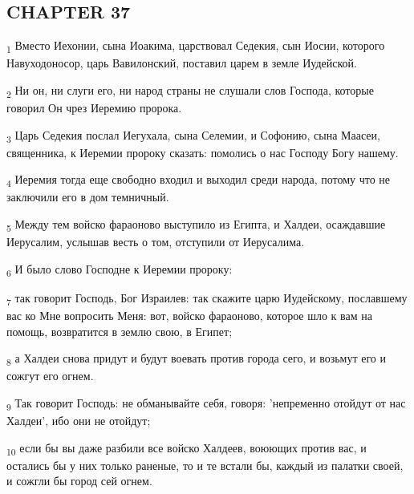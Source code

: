 \subsection{CHAPTER 37}
\begin{tcolorbox}
\textsubscript{1} Вместо Иехонии, сына Иоакима, царствовал Седекия, сын Иосии, которого Навуходоносор, царь Вавилонский, поставил царем в земле Иудейской.
\end{tcolorbox}
\begin{tcolorbox}
\textsubscript{2} Ни он, ни слуги его, ни народ страны не слушали слов Господа, которые говорил Он чрез Иеремию пророка.
\end{tcolorbox}
\begin{tcolorbox}
\textsubscript{3} Царь Седекия послал Иегухала, сына Селемии, и Софонию, сына Маасеи, священника, к Иеремии пророку сказать: помолись о нас Господу Богу нашему.
\end{tcolorbox}
\begin{tcolorbox}
\textsubscript{4} Иеремия тогда еще свободно входил и выходил среди народа, потому что не заключили его в дом темничный.
\end{tcolorbox}
\begin{tcolorbox}
\textsubscript{5} Между тем войско фараоново выступило из Египта, и Халдеи, осаждавшие Иерусалим, услышав весть о том, отступили от Иерусалима.
\end{tcolorbox}
\begin{tcolorbox}
\textsubscript{6} И было слово Господне к Иеремии пророку:
\end{tcolorbox}
\begin{tcolorbox}
\textsubscript{7} так говорит Господь, Бог Израилев: так скажите царю Иудейскому, пославшему вас ко Мне вопросить Меня: вот, войско фараоново, которое шло к вам на помощь, возвратится в землю свою, в Египет;
\end{tcolorbox}
\begin{tcolorbox}
\textsubscript{8} а Халдеи снова придут и будут воевать против города сего, и возьмут его и сожгут его огнем.
\end{tcolorbox}
\begin{tcolorbox}
\textsubscript{9} Так говорит Господь: не обманывайте себя, говоря: 'непременно отойдут от нас Халдеи', ибо они не отойдут;
\end{tcolorbox}
\begin{tcolorbox}
\textsubscript{10} если бы вы даже разбили все войско Халдеев, воюющих против вас, и остались бы у них только раненые, то и те встали бы, каждый из палатки своей, и сожгли бы город сей огнем.
\end{tcolorbox}
